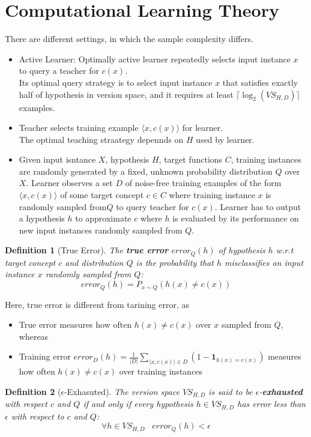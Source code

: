 \documentclass[12pt]{article}
\newtheorem{definition}{Definition}[section]
\theoremstyle{definition}
\begin{document}
\section{Computational Learning Theory}
There are different settings, in which the sample complexity differs.
\begin{itemize}
	\item Active Learner: Optimally active learner repeatedly selects input instance $x$ to query a teacher for $c(x)$. \\Its optimal query strategy is to select input instance $x$ that satisfies exactly half of hypothesis in version space, and it requires at least $\lceil \log_2(VS_{H,D})\rceil$ examples.
	\item Teacher selects training example $\langle x, c(x)\rangle$ for learner.\\
	The optimal teaching straategy depennds on $H$ used by learner.
	\item Given input isntance $X$, hypothesis $H$, target functions $C$, training instances are randomly generated by a fixed, unknown probability distribution $Q$ over $X$. Learner observes a set $D$ of noise-free training examples of the form $\langle x, c(x)\rangle$ of some target concept $c\in C$ where training instance $x$ is randomly sampled from$Q$ to query teacher for $c(x)$. Learner has to output a hypothesis $h$ to approximate $c$ where $h$ is evaluated by its performance on new input instances randomly sampled from $Q$.
\end{itemize}
\begin{definition}[True Error]
\normalfont The \textbf{true error} $\textit{error}_Q(h)$ of hypothesis $h$ w.r.t target concept $c$ and distribution $Q$ is the probability that $h$ misclassifies an input instance $x$ randomly sampled from $Q$:
\[
\textit{error}_Q(h)=P_{x\sim Q}(h(x)\neq c(x))
\]
\end{definition}
Here, true error is different from tarining error, as 
\begin{itemize}
	\item True error measures how often $h(x)\neq c(x)$ over $x$ sampled from $Q$, whereas
	\item Training error $\textit{error}_D(h)=\frac{1}{|D|}\sum_{\langle x, c(x)\rangle\in D}(1-\mathbf{1}_{h(x)=c(x)})$ measures how often $h(x)\neq c(x)$ over training instances
\end{itemize}
\begin{definition}[{$\epsilon$}-Exhasuted]
\normalfont The version space $VS_{H, D}$ is said to be $\epsilon$-\textbf{exhausted} with respect $c$ and $Q$ \textit{if and only if} every hypothesis $h\in VS_{H, D}$ has error less than $\epsilon$ with respect to $c$ and $Q$:
\[
\forall h\in VS_{H, D}\;\;\;\textit{error}_Q(h)<\epsilon
\]
\end{definition}
\end{document}
